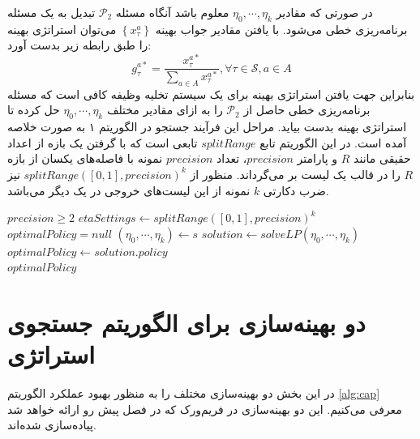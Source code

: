 در صورتی که مقادیر
$\eta_0, \cdots, \eta_k$
معلوم باشد آنگاه مسئله
$\mathcal{P}_2$
تبدیل به یک مسئله برنامه‌ریزی خطی می‌شود. با یافتن مقادیر جواب بهینه
$\left\{x_{\tau}^{a}\right\}$ 
می‌توان استراتژی بهینه را طبق رابطه زیر بدست آورد:
\begin{equation}
	g_{\tau}^{a *}=\frac{x_{\tau}^{a *}}{\sum_{a \in A} x_{\tau}^{a *}}, \forall \tau \in \mathcal{S}, a \in A
\end{equation}
بنابراین جهت یافتن استراتژی بهینه برای یک سیستم تخلیه وظیفه کافی است که مسئله برنامه‌ریزی خطی حاصل از
$\mathcal{P}_2$
را به ازای مقادیر مختلف 
$\eta_0, \cdots, \eta_k$
حل کرده تا استراتژی بهینه بدست بیاید. مراحل این فرآیند جستجو در الگوریتم ۱ به صورت خلاصه آمده است. در این الگوریتم تابع $splitRange$ تابعی است که با گرفتن یک بازه از اعداد حقیقی مانند $R$ و پارامتر $precision$، تعداد $precision$ نمونه با فاصله‌های یکسان از بازه $R$ را در قالب یک لیست بر می‌گرداند. منظور از $splitRange([0, 1], precision)^k$ نیز ضرب دکارتی $k$ نمونه از این لیست‌های خروجی در یک دیگر می‌باشد.

\begin{latin}
	\begin{algorithm}
		\begin{algorithmic}[1]
			\Require $precision \geq 2$
			\State $etaSettings \gets splitRange([0, 1], precision)^k$
			\State $optimalPolicy = null$
				\State $(\eta_0, \cdots, \eta_k) \gets s$
				\State $solution \gets solveLP(\eta_0, \cdots, \eta_k)$
					\State $optimalPolicy \gets solution.policy$
				\EndIf
			\EndFor \\
			\Return $optimalPolicy$
		\end{algorithmic}
	\end{algorithm}
\end{latin}
\newpage
\section{دو بهینه‌سازی برای الگوریتم جستجوی استراتژی}
\label{sec:optim}
در این بخش دو بهینه‌سازی مختلف را به منظور بهبود عملکرد الگوریتم \ref{alg:cap} معرفی می‌کنیم. این دو بهینه‌سازی در فریم‌ورک  که در فصل پیش رو ارائه خواهد شد پیاده‌سازی شده‌اند.
